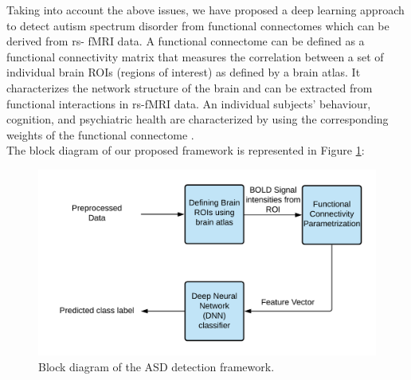 Taking into account the above issues, we have proposed a deep learning approach to detect
autism spectrum disorder from functional connectomes which can be derived from rs- fMRI
data. A functional connectome can be defined as a functional connectivity matrix that
measures the correlation between a set of individual brain \gls{ROI}s (regions of interest) as
defined by a brain atlas. It characterizes the network structure of the brain and can be
extracted from functional interactions in rs-fMRI data. An individual subjects’ behaviour, cognition, and psychiatric health are characterized by using the corresponding weights of the
functional connectome \cite{varoquaux2013learning}.\\

\newpage
The block diagram of our proposed framework is represented in Figure \ref{fig: 1.1}:\\

\begin{figure}[h]
\centering
\includegraphics[width=\textwidth]{figures/figure1.1.png}
\caption{Block diagram of the ASD detection framework.}
\label{fig: 1.1}
\end{figure}

